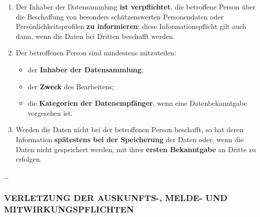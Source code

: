 \begin{enumerate}
\def\labelenumi{\arabic{enumi}.}
\tightlist
\item
  Der Inhaber der Datensammlung \textbf{ist verpflichtet}, die
  betroffene Person über die Beschaffung von besonders schützenswerten
  Personendaten oder Persönlichkeitsprofilen \textbf{zu informieren};
  diese Informationspflicht gilt auch dann, wenn die Daten bei Dritten
  beschafft werden.
\item
  Der betroffenen Person sind mindestens mitzuteilen:

  \begin{itemize}
  \tightlist
  \item
    der \textbf{Inhaber der Datensammlung};
  \item
    der \textbf{Zweck} des Bearbeitens;
  \item
    die \textbf{Kategorien der Datenempfänger}, wenn eine
    Datenbekanntgabe vorgesehen ist.
  \end{itemize}
\item
  Werden die Daten nicht bei der betroffenen Person beschafft, so hat
  deren Information \textbf{spätestens bei der Speicherung} der Daten
  oder, wenn die Daten nicht gespeichert werden, mit ihrer
  \textbf{ersten Bekanntgabe} an Dritte zu erfolgen.
\end{enumerate}

\ldots{}

\hypertarget{verletzung-der-auskunfts--melde--und-mitwirkungspflichten}{%
\subsubsection{VERLETZUNG DER AUSKUNFTS-, MELDE- UND
MITWIRKUNGSPFLICHTEN}\label{verletzung-der-auskunfts--melde--und-mitwirkungspflichten}}

